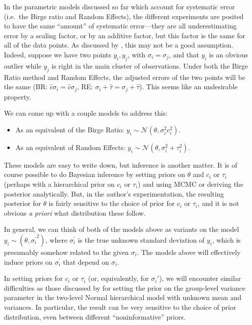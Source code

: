 \documentclass[12pt]{article}
\begin{document}
In the parametric models discussed so far which account for systematic error (i.e.~the Birge ratio and Random Effects), the different experiments are posited to have the same ``amount'' of systematic error---they are all underestimating error by a scaling factor, or by an additive factor, but this factor is the same for all of the data points. As discussed by \citet{taylor1982numerical}, this may not be a good assumption. Indeed, suppose we have two points $y_i,y_j$, with $\sigma_i=\sigma_j$, and that $y_i$ is an obvious outlier while $y_j$ is right in the main cluster of observations. Under both the Birge Ratio method and Random Effects, the adjusted errors of the two points will be the same (BR: $\hat c\sigma_i=\hat c\sigma_j$, RE: $\sigma_i+\hat \tau=\sigma_j+\hat \tau$). This seems like an undesirable property.

We can come up with a couple models to address this:
\begin{itemize}
  \item As an equivalent of the Birge Ratio: $y_i\sim\mathcal{N}(\theta,\sigma_i^2c_i^2)$.
  \item As an equivalent of Random Effects: $y_i\sim\mathcal{N}(\theta,\sigma_i^2+\tau_i^2)$.
\end{itemize}
These models are easy to write down, but inference is another matter. It is of course possible to do Bayesian inference by setting priors on $\theta$ and $c_i$ or $\tau_i$ (perhaps with a hierarchical prior on $c_i$ or $\tau_i$) and using MCMC or deriving the posterior analytically. But, in the author's experimentation, the resulting posterior for $\theta$ is fairly sensitive to the choice of prior for $c_i$ or $\tau_i$, and it is not obvious \textit{a priori} what distribution these follow.

In general, we can think of both of the models above as variants on the model $y_i\sim(\theta,{\sigma_i^\prime}^2)$, where $\sigma_i^\prime$ is the true unknown standard deviation of $y_i$, which is presumably somehow related to the given $\sigma_i$. The models above will effectively induce priors on $\sigma_i^\prime$ that depend on $\sigma_i$.

In setting priors for $c_i$ or $\tau_i$ (or, equivalently, for $\sigma_i'$), we will encounter similar difficulties as those discussed by \citet{gelman2006prior} for setting the prior on the group-level variance parameter in the two-level Normal hierarchical model with unknown mean and variances. In particular, the result can be very sensitive to the choice of prior distribution, even between different ``noninformative'' priors.
\end{document}

